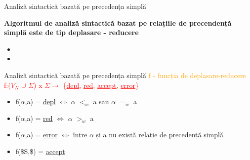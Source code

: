 \documentclass[pdf]{beamer}
\begin{document}
\begin{frame}{Analiză sintactică bazată pe precedența simplă}

\textbf{Algoritmul de analiză sintactică bazat pe relațiile de precendență simplă este de tip deplasare - reducere}
\newline

\begin{itemize}
    \item {}
    
    \item {}
\end{itemize}

\end{frame}



\begin{frame}{Analiză sintactică bazată pe precedența simplă}
\textcolor{orange}{f - funcția de deplasare-reducere}\\
 
\textcolor{red}{f:($V_{N}$ $\cup$ $\Sigma$) x $\Sigma \rightarrow$ \{\underline{depl}, \underline{red}, \underline{accept}, \underline{error}\}\;}\\

\begin{itemize}
\item
f($\alpha$,a) = \underline{depl} $\iff$ $\alpha$ $<_{w}$ a sau $\alpha$ $=_{w}$ a\;

\item
f($\alpha$,a) = \underline{red} $\iff$ $\alpha$ $>_{w}$ a\;

\item
f($\alpha$,a) = \underline{error} $\iff$ între $\alpha$ și a nu există relație de precedență simplă\;

\item
f(\$S,\$) = \underline{accept}
\end{itemize}

\end{frame}
\end{document}
